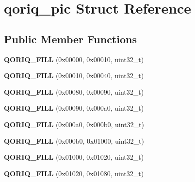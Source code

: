 \hypertarget{structqoriq__pic}{}\section{qoriq\+\_\+pic Struct Reference}
\label{structqoriq__pic}
\subsection*{Public Member Functions}
\begin{DoxyCompactItemize}
\item 
\mbox{\label{structqoriq__pic_a35accb42b2697db234063be2b00c5a9e}} 
{\bfseries Q\+O\+R\+I\+Q\+\_\+\+F\+I\+LL} (0x00000, 0x00010, uint32\+\_\+t)
\item 
\mbox{\label{structqoriq__pic_ae1b57403aba075c346780301a3345c97}} 
{\bfseries Q\+O\+R\+I\+Q\+\_\+\+F\+I\+LL} (0x00010, 0x00040, uint32\+\_\+t)
\item 
\mbox{\label{structqoriq__pic_af5aeb51dc4823b48a2d544fdba97b67d}} 
{\bfseries Q\+O\+R\+I\+Q\+\_\+\+F\+I\+LL} (0x00080, 0x00090, uint32\+\_\+t)
\item 
\mbox{\label{structqoriq__pic_affa9e95852bb52ca82519e1a5c5db461}} 
{\bfseries Q\+O\+R\+I\+Q\+\_\+\+F\+I\+LL} (0x00090, 0x000a0, uint32\+\_\+t)
\item 
\mbox{\label{structqoriq__pic_a03123b2d52d897784810c699281b0f20}} 
{\bfseries Q\+O\+R\+I\+Q\+\_\+\+F\+I\+LL} (0x000a0, 0x000b0, uint32\+\_\+t)
\item 
\mbox{\label{structqoriq__pic_ad5c6cec92b253cdc3dd91792f46d8a7f}} 
{\bfseries Q\+O\+R\+I\+Q\+\_\+\+F\+I\+LL} (0x000b0, 0x01000, uint32\+\_\+t)
\item 
\mbox{\label{structqoriq__pic_ae9053eee770c8c0650c2dfc4aa912386}} 
{\bfseries Q\+O\+R\+I\+Q\+\_\+\+F\+I\+LL} (0x01000, 0x01020, uint32\+\_\+t)
\item 
\mbox{\label{structqoriq__pic_a99b08d982b68f70483b446b5cbf53867}} 
{\bfseries Q\+O\+R\+I\+Q\+\_\+\+F\+I\+LL} (0x01020, 0x01080, uint32\+\_\+t)
\item 

\end{DoxyCompactItemize}
